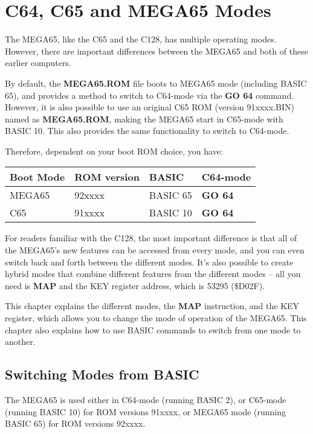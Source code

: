 \chapter {C64, C65 and MEGA65 Modes}
\label{cha:modes}

The MEGA65, like the C65 and the C128, has multiple operating modes.
However, there are important differences between the MEGA65 and both
of these earlier computers.

By default, the {\bf MEGA65.ROM} file boots to MEGA65 mode
(including BASIC 65), and
provides a method to switch to C64-mode via the {\bf GO 64} command.
However, it is also possible to use an original C65 ROM (version 91xxxx.BIN)
named as {\bf MEGA65.ROM}, making the MEGA65 start in C65-mode
with BASIC 10. This also provides the same functionality to switch to C64-mode.

Therefore, dependent on your boot ROM choice, you have:

\begin{center}
\begin{tabular}{|l|l|l|l|}
\hline
Boot Mode & ROM version & BASIC & C64-mode \\
\hline
MEGA65    & 92xxxx      & BASIC 65 & {\bf GO 64} \\
C65       & 91xxxx      & BASIC 10 & {\bf GO 64} \\
\hline
\end{tabular}
\end{center}
For readers familiar with the C128,
the most important difference is that all of the MEGA65's new features
can be accessed from every mode, and you can even switch back and forth
between the different modes. It's also possible to create hybrid modes that combine different
features from the different modes -- all you need is {\bf MAP} and the KEY register address,
which is 53295 (\$D02F).

This chapter explains the different modes, the {\bf MAP} instruction, and
the KEY register, which allows you to change the mode of operation of the MEGA65.
This chapter also explains how to use BASIC commands to switch from one mode to another.

\section{Switching Modes from BASIC}

The MEGA65 is used either
in C64-mode (running BASIC 2),
or C65-mode (running BASIC 10) for ROM versions 91xxxx,
or MEGA65 mode (running BASIC 65) for ROM versions 92xxxx.


